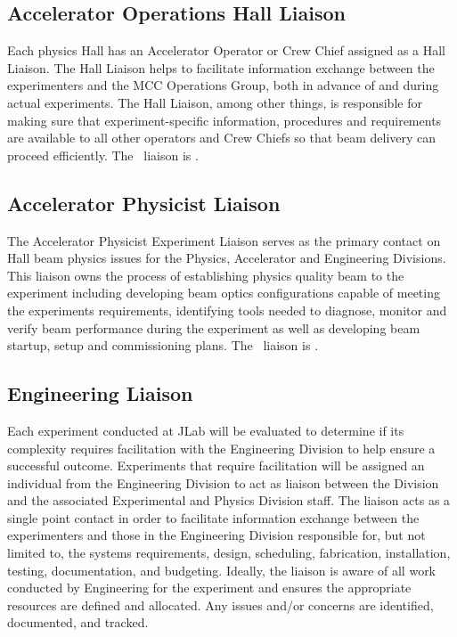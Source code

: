 \documentclass[11pt]{article}
\begin{document}
\subsection{Accelerator Operations Hall Liaison}
\indent

Each physics Hall has an Accelerator Operator or Crew Chief assigned as a Hall Liaison. 
The Hall Liaison helps to facilitate information exchange between the
experimenters and the MCC Operations Group, both in advance of and during
actual experiments. The Hall Liaison, among other things, is responsible 
for making sure that experiment-specific information, procedures and requirements 
are available to all other operators and Crew Chiefs so that beam delivery can proceed efficiently. The \HALL\ liaison is \ACCDIVLIAISON.

\subsection{Accelerator Physicist Liaison}
\indent

The Accelerator Physicist Experiment Liaison serves as the primary contact on Hall beam physics issues 
for the Physics, Accelerator and Engineering Divisions. This liaison owns the process of establishing 
physics quality beam to the experiment including developing beam optics configurations capable of 
meeting the experiments requirements, identifying tools needed to diagnose, monitor and verify 
beam performance during the experiment as well as developing beam startup, setup and commissioning 
plans. The \HALL\ liaison is \AccPhysLiaison.


\subsection{Engineering Liaison}
\indent

Each experiment conducted at JLab will be evaluated to determine if its complexity requires facilitation 
with the Engineering Division to help ensure a successful outcome.  Experiments that require 
facilitation will be assigned an individual from the Engineering Division to act as liaison 
between the Division and the associated Experimental and Physics Division staff. The liaison 
acts as a single point contact in order to facilitate information exchange 
between the experimenters and those in the Engineering Division responsible for, 
but not limited to, the systems requirements, design, scheduling, fabrication, 
installation, testing, documentation, and budgeting. Ideally, the liaison 
is aware of all work conducted by Engineering for the experiment and ensures 
the appropriate resources are defined and allocated. Any issues and/or concerns are identified, 
documented, and tracked.
\end{document}
